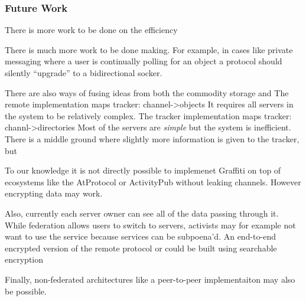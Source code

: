 
\subsubsection{Future Work}

There is more work to be done on the efficiency

There is much more work to be done making.
For example, in cases like private messaging where a user
is continually polling for an object a protocol should silently
``upgrade'' to a bidirectional socker.

There are also ways of fusing ideas from both the
commodity storage and
The remote implementation maps
tracker: channel->objects
It requires all servers in the system to be relatively complex.
The tracker implementation maps
tracker: channl->directories
Most of the servers are \emph{simple}
but the system is inefficient.
There is a middle ground where slightly more information
is given to the tracker, but

To our knowledge it is not directly possible to implemenet
Graffiti on top of ecosystems like the AtProtocol or ActivityPub
without leaking channels. However encrypting data may
work.

Also, currently each server owner can see all of the data
passing through it. While federation allows users to switch
to servers, activists may for example not want to use the service
because services can be subpoena'd.
An end-to-end encrypted version of the remote protocol or
could be built using  searchable encryption~\cite{searchableencryption}

Finally, non-federated architectures like a peer-to-peer
implementaiton may also be possible.
